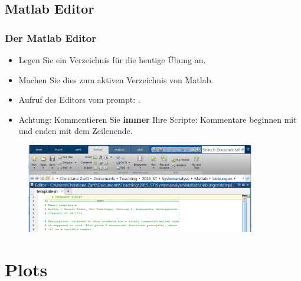       \subsection{Matlab Editor}
      \begin{frame}
          \frametitle{Der Matlab Editor}
          \begin{itemize}
              \item Legen Sie ein Verzeichnis für die heutige Übung an.
              \item Machen Sie dies zum aktiven Verzeichnis von Matlab.
              \item Aufruf des Editors vom prompt: .
              \item \alert{Achtung}: Kommentieren Sie \textbf{immer} Ihre Scripte: Kommentare beginnen mit \matlabInput{\%} und enden mit dem Zeilenende.
          \end{itemize}

          \begin{figure}
            \includegraphics[width=10.0cm]{matlab_gui.png}
          \end{figure}
      \end{frame}

      \section{Plots}

